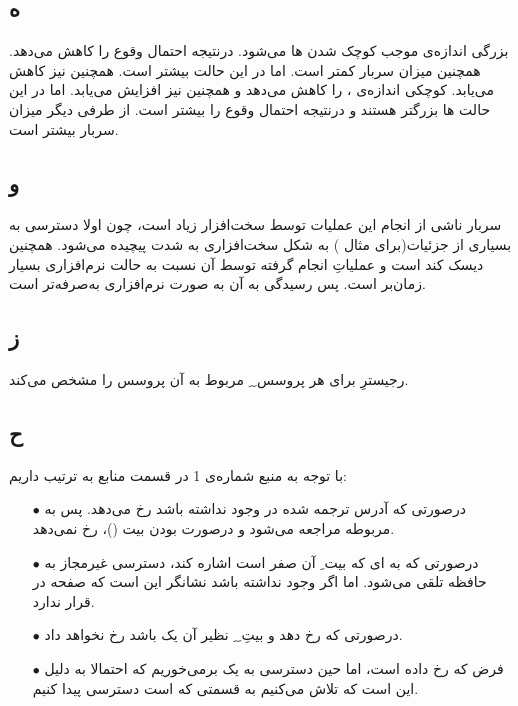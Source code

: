 \documentclass{article}
\begin{document}
\subsection{ه}
بزرگی اندازه‌ی  موجب کوچک شدن ها می‌شود. درنتیجه احتمال وقوع  را کاهش می‌دهد. همچنین میزان سربار کمتر است. اما  در این حالت بیشتر است. همچنین  نیز کاهش می‌یابد.
\newline
کوچکی اندازه‌ی ،   را کاهش می‌دهد و همچنین  نیز افزایش می‌یابد. اما در این حالت ها بزرگتر هستند و درنتیجه احتمال وقوع  را بیشتر است. از طرفی دیگر میزان سربار بیشتر است.
\subsection{و}
سربار ناشی از انجام این عملیات توسط سخت‌افزار زیاد است، چون اولا دسترسی به بسیاری از جزئیات(برای مثال ) به شکل سخت‌افزاری به شدت پیچیده می‌شود. همچنین دیسک کند است و عملیاتِ انجام گرفته توسط آن نسبت به حالت نرم‌افزاری بسیار زمان‌بر است. پس رسیدگی به آن به صورت نرم‌افزاری به‌صرفه‌تر است.
\subsection{ز}
رجیسترِ  برای هر پروسس ِ ِ مربوط به آن پروسس را مشخص می‌کند.
\subsection{ح}
با توجه به منبع شماره‌ی 1 در قسمت منابع به ترتیب داریم:
\begin{itemize}
    \item [$\bullet$] درصورتی که آدرس ترجمه شده در  وجود نداشته باشد  رخ می‌دهد. پس به  مربوطه مراجعه می‌شود و درصورت  بودن بیت ()،  رخ نمی‌دهد.
    \item [$\bullet$] درصورتی که به ای که بیت ِ آن صفر است اشاره کند، دسترسی غیرمجاز به حافظه تلقی می‌شود. اما اگر  وجود نداشته باشد نشانگر این است که صفحه در  قرار ندارد.
    \item [$\bullet$] درصورتی که  رخ دهد و بیتِ ِ ِ نظیر آن یک باشد  رخ نخواهد داد.
    \item [$\bullet$] فرض که  رخ داده است، اما حین دسترسی به یک  برمی‌خوریم که احتمالا به دلیل این است که تلاش می‌کنیم به قسمتی که  است دسترسی پیدا کنیم.
\end{itemize}
\end{document}
